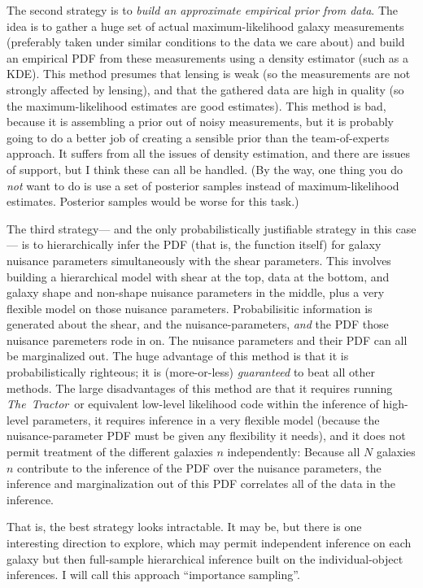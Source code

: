\documentclass[12pt]{article}
\newcommand{\project}[1]{\textsl{#1}}
\newcommand{\thetractor}{\project{The~Tractor}}
\begin{document}
The second strategy is to \emph{build an approximate empirical prior from data}.
The idea is to gather a huge set of actual maximum-likelihood galaxy measurements
  (preferably taken under similar conditions to the data we care about)
  and build an empirical PDF from these measurements using a density estimator
  (such as a KDE).
This method presumes that lensing is weak
  (so the measurements are not strongly affected by lensing),
  and that the gathered data are high in quality
  (so the maximum-likelihood estimates are good estimates).
This method is bad, because it is assembling a prior out of noisy measurements,
  but it is probably going to do a better job of creating a sensible prior
  than the team-of-experts approach.
It suffers from all the issues of density estimation,
  and there are issues of support,
  but I think these can all be handled.
(By the way, one thing you do \emph{not} want to do is use a set of posterior samples
  instead of maximum-likelihood estimates.
  Posterior samples would be worse for this task.)

The third strategy---%
  and the only probabilistically justifiable strategy in this case---%
  is to hierarchically infer the PDF (that is, the function itself) for galaxy nuisance parameters
  simultaneously with the shear parameters.
This involves building a hierarchical model with shear at the top,
  data at the bottom,
  and galaxy shape and non-shape nuisance parameters in the middle,
  plus a very flexible model on those nuisance parameters.
Probabilisitic information is generated about the shear,
  and the nuisance-parameters,
  \emph{and} the PDF those nuisance paremeters rode in on.
The nuisance parameters and their PDF can all be marginalized out.
The huge advantage of this method is that it is probabilistically righteous;
  it is (more-or-less) \emph{guaranteed} to beat all other methods.
The large disadvantages of this method are that
  it requires running \thetractor\ or equivalent low-level likelihood code
  within the inference of high-level parameters,
  it requires inference in a very flexible model
  (because the nuisance-parameter PDF must be given any flexibility it needs),
  and it does not permit treatment of the different galaxies $n$ independently:
Because all $N$ galaxies $n$ contribute to the inference of the PDF over the nuisance parameters,
  the inference and marginalization out of this PDF correlates all of the data in the inference.

That is, the best strategy looks intractable.
It may be, but there is one interesting direction to explore,
  which may permit independent inference on each galaxy but then full-sample hierarchical inference
  built on the individual-object inferences.
I will call this approach ``importance sampling''.
\end{document}
